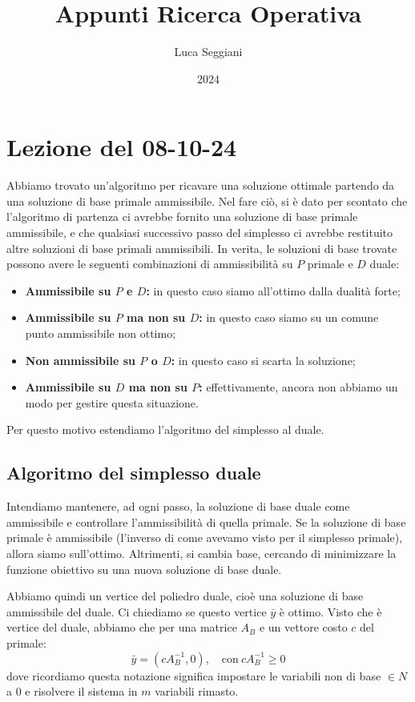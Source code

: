 \documentclass[a4paper,11pt]{article}
\title{Appunti Ricerca Operativa}
\author{Luca Seggiani}
\date{2024}
\begin{document}
\section{Lezione del 08-10-24}

\thispagestyle{empty}
\pagestyle{fancy}

Abbiamo trovato un'algoritmo per ricavare una soluzione ottimale partendo da una soluzione di base primale ammissibile.
Nel fare ciò, si è dato per scontato che l'algoritmo di partenza ci avrebbe fornito una soluzione di base primale ammissibile, e che qualsiasi successivo passo del simplesso ci avrebbe restituito altre soluzioni di base primali ammissibili.
In verita, le soluzioni di base trovate possono avere le seguenti combinazioni di ammissibilità su $P$ primale e $D$ duale:
\begin{itemize}
	\item \textbf{Ammissibile su $P$ e $D$:} in questo caso siamo all'ottimo dalla dualità forte;
	\item \textbf{Ammissibile su $P$ ma non su $D$:} in questo caso siamo su un comune punto ammissibile non ottimo;
	\item \textbf{Non ammissibile su $P$ o $D$:} in questo caso si scarta la soluzione;
	\item \textbf{Ammissibile su $D$ ma non su $P$:} effettivamente, ancora non abbiamo un modo per gestire questa situazione.
\end{itemize}

Per questo motivo estendiamo l'algoritmo del simplesso al duale.

\subsection{Algoritmo del simplesso duale}
Intendiamo mantenere, ad ogni passo, la soluzione di base duale come ammissibile e controllare l'ammissibilità di quella primale.
Se la soluzione di base primale è ammissibile (l'inverso di come avevamo visto per il simplesso primale), allora siamo sull'ottimo.
Altrimenti, si cambia base, cercando di minimizzare la funzione obiettivo su una nuova soluzione di base duale.

Abbiamo quindi un vertice del poliedro duale, cioè una soluzione di base ammissibile del duale. 
Ci chiediamo se questo vertice $\bar{y}$ è ottimo.
Visto che è vertice del duale, abbiamo che per una matrice $A_B$ e un vettore costo $c$ del primale:
$$
\bar{y} = (cA_B^{-1}, 0), \quad \text{con} \ cA_B^{-1} \geq 0 
$$
dove ricordiamo questa notazione significa impostare le variabili non di base $\in N$ a $0$ e risolvere il sistema in $m$ variabili rimasto.
\end{document}
